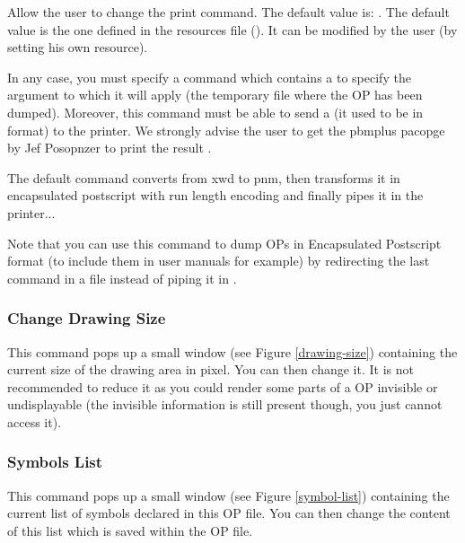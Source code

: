 Allow the user to change the print command. The default value is: \*
.
The default value is the one defined in the  resources
file (). It can be modified by the user (by
setting his own resource).

In any case, you must specify a command which contains a  to specify
the argument to which it will apply (the temporary file where the OP has been
dumped). Moreover, this command must be able to send a  (it used to
be in  format) to the printer.  We strongly advise the user to get
the pbmplus pacopge by Jef Posopnzer to print the result \cite{pbm-manual}.

The default command converts from xwd to pnm, then
transforms it in encapsulated postscript with
run length encoding and finally pipes it in the printer...

Note that you can use this command to dump OPs in Encapsulated Postscript
format (to include them in user manuals for example) by redirecting the last
command in a file instead of piping it in .

\subsubsection{Change Drawing Size}


This command pops up a small window (see Figure \ref{drawing-size}) containing
the current size of the drawing area in pixel. You can then change it. It is
not recommended to reduce it as you could render some parts of a OP invisible
or undisplayable (the invisible information is still present though, you just
cannot access it).

\subsubsection{Symbols List}


This command pops up a small window (see Figure \ref{symbol-list}) containing
the current list  of symbols declared in this OP file. You can then change the
content of this list which is saved within the OP file.

